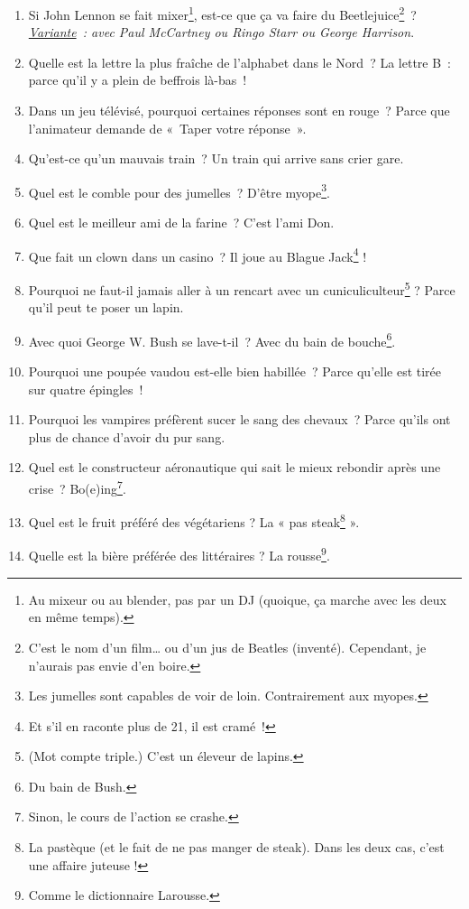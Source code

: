 \documentclass[10pt,a5paper,fullpage]{book}
\begin{document}
\begin{enumerate}
		\item Si John Lennon se fait mixer\footnote{Au mixeur ou au blender, pas par un DJ (quoique, ça marche avec les deux en même temps).}, est-ce que ça va faire du Beetlejuice\footnote{C’est le nom d’un film… ou d’un jus de Beatles (inventé). Cependant, je n'aurais pas envie d'en boire.}~? \\\textit{\underline{Variante}~: avec Paul McCartney ou Ringo Starr ou George Harrison}.
		\item Quelle est la lettre la plus fraîche de l’alphabet dans le Nord~? La lettre B~: parce qu’il y a plein de beffrois là-bas~!
		\item Dans un jeu télévisé, pourquoi certaines réponses sont en rouge~? Parce que l’animateur demande de «~Taper votre réponse~».
		\item Qu’est-ce qu’un mauvais train~?  Un train qui arrive sans crier gare.
		\item Quel est le comble pour des jumelles~? D’être myope\footnote{Les jumelles sont capables de voir de loin. Contrairement aux myopes.}.
		\item Quel est le meilleur ami de la farine~? C’est l’ami Don.
		\item Que fait un clown dans un casino~? Il joue au Blague Jack\footnote{Et s’il en raconte plus de 21, il est cramé~!} !
		\item Pourquoi ne faut-il jamais aller à un rencart avec un cuniculiculteur\footnote{(Mot compte triple.) C'est un éleveur de lapins.} ? Parce qu'il peut te poser un lapin. 
		\item Avec quoi George W. Bush se lave-t-il~? Avec du bain de bouche\footnote{Du bain de Bush.}.  
		\item Pourquoi une poupée vaudou est-elle bien habillée~? Parce qu’elle est tirée sur quatre épingles~!
		\item Pourquoi les vampires préfèrent sucer le sang des chevaux~? Parce qu’ils ont plus de chance d’avoir du pur sang. 
		\item Quel est le constructeur aéronautique qui sait le mieux rebondir après une crise~? Bo(e)ing\footnote{Sinon, le cours de l'action se crashe.}.
		\item Quel est le fruit préféré des végétariens ? La « pas steak\footnote{La pastèque (et le fait de ne pas manger de steak). Dans les deux cas, c'est une affaire juteuse !} ».
		\item Quelle est la bière préférée des littéraires ? La rousse\footnote{Comme le dictionnaire Larousse.}.

\end{enumerate}
\end{document}
